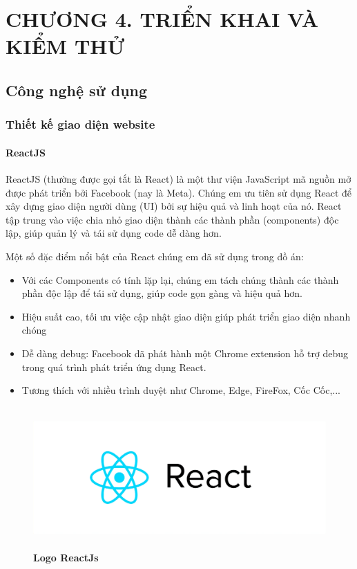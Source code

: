 
\section*{CHƯƠNG 4. TRIỂN KHAI VÀ KIỂM THỬ}
\setcounter{section}{4}
\setcounter{subsection}{0} %
\setcounter{table}{0} %
\setcounter{figure}{0} %

\subsection{Công nghệ sử dụng}
\subsubsection{Thiết kế giao diện website}
\paragraph{ReactJS}
\mbox{}

ReactJS (thường được gọi tắt là React) là một thư viện JavaScript mã nguồn mở được phát triển bởi Facebook (nay là Meta). Chúng em ưu tiên sử dụng React để xây dựng giao diện người dùng (UI) bởi sự hiệu quả và linh hoạt của nó. React tập trung vào việc chia nhỏ giao diện thành các thành phần (components) độc lập, giúp quản lý và tái sử dụng code dễ dàng hơn.

Một số đặc điểm nổi bật của React chúng em đã sử dụng trong đồ án:
\begin{itemize}
	\item Với các Components có tính lặp lại, chúng em tách chúng thành các thành phần độc lập để tái sử dụng, giúp code gọn gàng và hiệu quả hơn.
	\item Hiệu suất cao, tối ưu việc cập nhật giao diện giúp phát triển giao diện nhanh chóng
	\item Dễ dàng debug: Facebook đã phát hành một Chrome extension hỗ trợ debug trong quá trình phát triển ứng dụng React.
	\item Tương thích với nhiều trình duyệt như Chrome, Edge, FireFox, Cốc Cốc,...
\end{itemize}

\begin{figure}[H]
	\centering
	\includegraphics[width=15cm,height=5.4cm]{Images/Technology/react_logo.png}
	\caption[Logo ReactJs]{\bfseries \fontsize{12pt}{0pt}
		\selectfont Logo ReactJs}
	\label{reactjs_cover} %
\end{figure}

